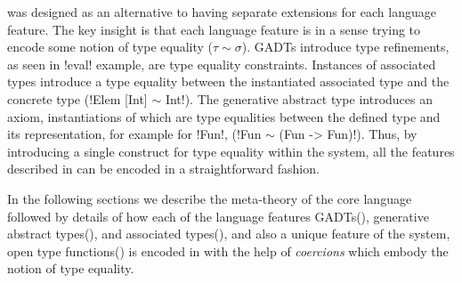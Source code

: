\documentclass[manuscript,screen,nonacm]{acmart}
\begin{document}
\SFC\cite{sulzmann_system_2007} was designed as an alternative to having separate extensions for each language feature. The key insight is that each language feature is in a sense trying to encode some notion of type equality ($\tau\sim\sigma$). GADTs introduce type refinements, as seen in !eval! example, are type equality constraints. Instances of associated types introduce a type equality between the instantiated associated type and the concrete type (!Elem [Int] $\sim$ Int!). The generative abstract type introduces an axiom, instantiations of which are type equalities between the defined type and its representation, for example for !Fun!, (!Fun $\sim$ (Fun -> Fun)!). Thus, by introducing a single construct for type equality within the system, all the features described in  can be encoded in a straightforward fashion.

In the following sections we describe the  meta-theory of the core language followed by details of how each of the language features GADTs(), generative abstract types(), and associated types(), and also a unique feature of the system, open type functions() is encoded in \SFC with the help of \emph{coercions} which embody the notion of type equality.







\end{document}

